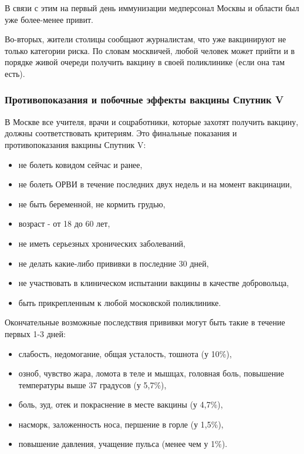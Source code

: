 В связи с этим на первый день иммунизации медперсонал Москвы и области был уже
более-менее привит.

Во-вторых, жители столицы сообщают журналистам, что уже вакцинируют не только
категории риска. По словам москвичей, любой человек может прийти и в порядке
живой очереди получить вакцину в своей поликлинике (если она там есть). 

\subsubsection{Противопоказания и побочные эффекты вакцины Спутник V}

В Москве все учителя, врачи и соцработники, которые захотят получить вакцину,
должны соответствовать критериям. Это финальные показания и противопоказания
вакцины Спутник V: 

\begin{itemize}
  \item не болеть ковидом сейчас и ранее,
  \item не болеть ОРВИ в течение последних двух недель и на момент вакцинации, 
  \item не быть беременной, не кормить грудью,
  \item возраст - от 18 до 60 лет, 
  \item не иметь серьезных хронических заболеваний, 
  \item не делать какие-либо прививки в последние 30 дней,
  \item не участвовать в клиническом испытании вакцины в качестве добровольца, 
  \item быть прикрепленным к любой московской поликлинике. 
\end{itemize}

Окончательные возможные последствия прививки могут быть такие в течение первых 1-3 дней:

\begin{itemize}
  \item слабость, недомогание, общая усталость, тошнота (у 10\%), 
  \item озноб, чувство жара, ломота в теле и мышцах, головная боль, повышение температуры выше 37 градусов (у 5,7\%), 
  \item боль, зуд, отек и покраснение в месте вакцины (у 4,7\%), 
  \item насморк, заложенность носа, першение в горле (у 1,5\%), 
  \item повышение давления, учащение пульса (менее чем у 1\%). 
\end{itemize}

